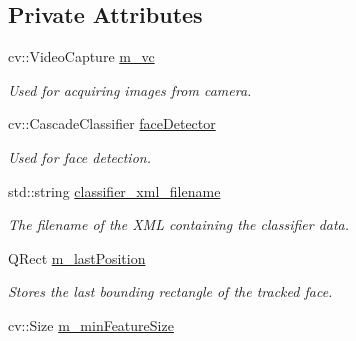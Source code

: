 \subsection*{Private Attributes}
\begin{DoxyCompactItemize}
\item 
\hypertarget{class_face_tracker_abe09a6a15e706ccc6eb2519b111408ea}{cv\-::\-Video\-Capture \hyperlink{class_face_tracker_abe09a6a15e706ccc6eb2519b111408ea}{m\-\_\-vc}}\label{class_face_tracker_abe09a6a15e706ccc6eb2519b111408ea}

\begin{DoxyCompactList}\small\item\em Used for acquiring images from camera. \end{DoxyCompactList}\item 
\hypertarget{class_face_tracker_ae08ea33c9ba73ec5b3ec8095de2a979b}{cv\-::\-Cascade\-Classifier \hyperlink{class_face_tracker_ae08ea33c9ba73ec5b3ec8095de2a979b}{face\-Detector}}\label{class_face_tracker_ae08ea33c9ba73ec5b3ec8095de2a979b}

\begin{DoxyCompactList}\small\item\em Used for face detection. \end{DoxyCompactList}\item 
\hypertarget{class_face_tracker_ab085d40697f7a2c1ffd7164be55df882}{std\-::string \hyperlink{class_face_tracker_ab085d40697f7a2c1ffd7164be55df882}{classifier\-\_\-xml\-\_\-filename}}\label{class_face_tracker_ab085d40697f7a2c1ffd7164be55df882}

\begin{DoxyCompactList}\small\item\em The filename of the X\-M\-L containing the classifier data. \end{DoxyCompactList}\item 
\hypertarget{class_face_tracker_abac52b7656b60f00bb665740b8f3826b}{Q\-Rect \hyperlink{class_face_tracker_abac52b7656b60f00bb665740b8f3826b}{m\-\_\-last\-Position}}\label{class_face_tracker_abac52b7656b60f00bb665740b8f3826b}

\begin{DoxyCompactList}\small\item\em Stores the last bounding rectangle of the tracked face. \end{DoxyCompactList}\item 
\hypertarget{class_face_tracker_a10d5fe065cfb5aa8fef1cbe2eea1361b}{cv\-::\-Size \hyperlink{class_face_tracker_a10d5fe065cfb5aa8fef1cbe2eea1361b}{m\-\_\-min\-Feature\-Size}}\label{class_face_tracker_a10d5fe065cfb5aa8fef1cbe2eea1361b}


\end{DoxyCompactItemize}
